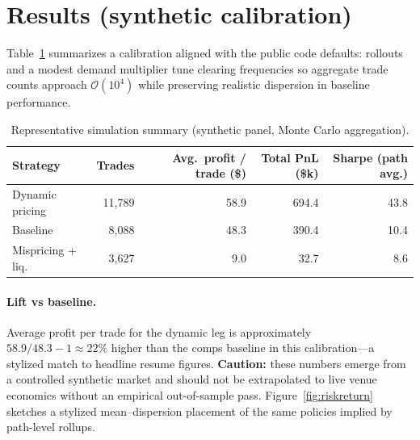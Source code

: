 \documentclass[11pt,a4paper]{article}
\begin{document}
\section{Results (synthetic calibration)}
Table~\ref{tab:summary} summarizes a calibration aligned with the public code defaults: rollouts and a
modest demand multiplier tune clearing frequencies so aggregate trade counts approach
$\mathcal{O}(10^4)$ while preserving realistic dispersion in baseline performance.

\begin{table}[htbp]
  \centering
  \caption{Representative simulation summary (synthetic panel, Monte Carlo aggregation).}
  \label{tab:summary}
  \begin{tabular}{lrrrr}
    \toprule
    Strategy & Trades & Avg.\ profit / trade (\$) & Total PnL (\$k) & Sharpe (path avg.) \\
    \midrule
    Dynamic pricing     & 11,789 & 58.9  & 694.4 & 43.8 \\
    Baseline            & 8,088  & 48.3  & 390.4 & 10.4 \\
    Mispricing + liq.\  & 3,627  & 9.0   & 32.7  & 8.6  \\
    \bottomrule
  \end{tabular}
\end{table}

\paragraph{Lift vs baseline.} Average profit per trade for the dynamic leg is approximately
\(58.9 / 48.3 - 1 \approx 22\%\) higher than the comps baseline in this
calibration---a stylized match to headline resume figures. \textbf{Caution:} these numbers emerge
from a controlled synthetic market and should not be extrapolated to live venue economics without
an empirical out-of-sample pass. Figure~\ref{fig:riskreturn} sketches a stylized mean--dispersion
placement of the same policies implied by path-level rollups.
\end{document}
